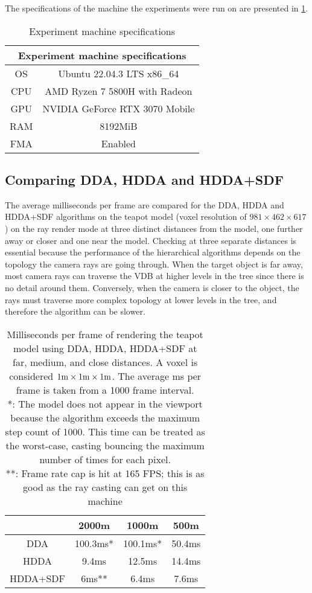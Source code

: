 The specifications of the machine the experiments were run on are presented in \cref{specs}.
\begin{table}[h]
  \centering
\begin{tabular}{|c||c|}
  \hline
  \multicolumn{2}{|c|}{Experiment machine specifications} \\
  \hline
  OS & Ubuntu 22.04.3 LTS x86\_64\\
  \hline
  CPU & AMD Ryzen 7 5800H with Radeon\\
  \hline
  GPU &  NVIDIA GeForce RTX 3070 Mobile\\
  \hline
  RAM & 8192MiB \\
  \hline
  FMA & Enabled \\
  \hline
\end{tabular}
  \caption{Experiment machine specifications}
  \label{specs}
\end{table}

\subsection{Comparing DDA, HDDA and HDDA+SDF}

The average milliseconds per frame are compared for the DDA, HDDA and HDDA+SDF algorithms on the teapot model (voxel resolution of $981\times462\times617$) on the ray render mode at three distinct distances from the model, one further away or closer and one near the model. Checking at three separate distances is essential because the performance of the hierarchical algorithms depends on the topology the camera rays are going through. When the target object is far away, most camera rays can traverse the VDB at higher levels in the tree since there is no detail around them. Conversely, when the camera is closer to the object, the rays must traverse more complex topology at lower levels in the tree, and therefore the algorithm can be slower.

\begin{table}[h]
  \centering
  \begin{tabular}{|c||c|c|c|}
    \hline
    & 2000m & 1000m & 500m \\
    \hline
    DDA & 100.3ms* & 100.1ms* & 50.4ms \\
    \hline
    HDDA & 9.4ms & 12.5ms & 14.4ms \\
    \hline
    HDDA+SDF & 6ms** & 6.4ms & 7.6ms\\
    \hline
  \end{tabular}
  \caption[DDA vs. HDDA vs. HDDA+SDF on teapot model]{Milliseconds per frame of rendering the teapot model using DDA, HDDA, HDDA+SDF at far, medium, and close distances. A voxel is considered $1\rm{m}\times1\rm{m}\times1\rm{m}$. The average ms per frame is taken from a 1000 frame interval.\\
    *: The model does not appear in the viewport because the algorithm exceeds the maximum step count of 1000. This time can be treated as the worst-case, casting bouncing the maximum number of times for each pixel.\\
    **: Frame rate cap is hit at 165 FPS; this is as good as the ray casting can get on this machine}
  \label{table:2}
\end{table}

